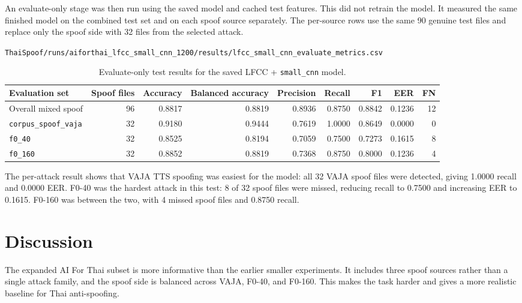 \documentclass[11pt,a4paper]{article}
\begin{document}
An evaluate-only stage was then run using the saved model and cached test features. This did not retrain the model. It measured the same finished model on the combined test set and on each spoof source separately. The per-source rows use the same 90 genuine test files and replace only the spoof side with 32 files from the selected attack.

\begin{center}
\texttt{ThaiSpoof/runs/aiforthai\_lfcc\_small\_cnn\_1200/results/lfcc\_small\_cnn\_evaluate\_metrics.csv}
\end{center}

\begin{table}[h]
\centering
\small
\caption{Evaluate-only test results for the saved LFCC + \texttt{small\_cnn} model.}
\label{tab:attack-results}
\begin{tabular}{lrrrrrrrr}
\toprule
Evaluation set & Spoof files & Accuracy & Balanced accuracy & Precision & Recall & F1 & EER & FN \\
\midrule
Overall mixed spoof & 96 & 0.8817 & 0.8819 & 0.8936 & 0.8750 & 0.8842 & 0.1236 & 12 \\
\texttt{corpus\_spoof\_vaja} & 32 & 0.9180 & 0.9444 & 0.7619 & 1.0000 & 0.8649 & 0.0000 & 0 \\
\texttt{f0\_40} & 32 & 0.8525 & 0.8194 & 0.7059 & 0.7500 & 0.7273 & 0.1615 & 8 \\
\texttt{f0\_160} & 32 & 0.8852 & 0.8819 & 0.7368 & 0.8750 & 0.8000 & 0.1236 & 4 \\
\bottomrule
\end{tabular}
\end{table}

The per-attack result shows that VAJA TTS spoofing was easiest for the model: all 32 VAJA spoof files were detected, giving 1.0000 recall and 0.0000 EER. F0-40 was the hardest attack in this test: 8 of 32 spoof files were missed, reducing recall to 0.7500 and increasing EER to 0.1615. F0-160 was between the two, with 4 missed spoof files and 0.8750 recall.

\section{Discussion}

The expanded AI For Thai subset is more informative than the earlier smaller experiments. It includes three spoof sources rather than a single attack family, and the spoof side is balanced across VAJA, F0-40, and F0-160. This makes the task harder and gives a more realistic baseline for Thai anti-spoofing.
\end{document}
